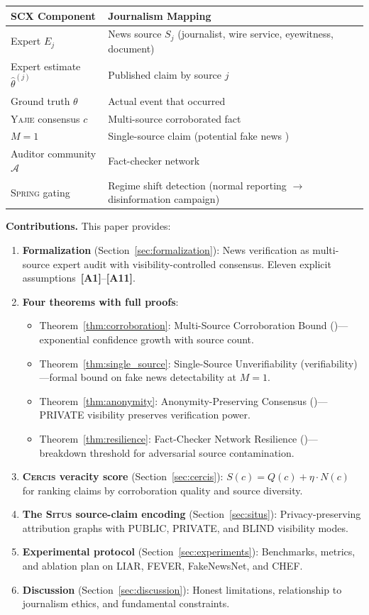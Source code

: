 \documentclass[11pt,a4paper]{article}
\theoremstyle{definition}
\newcommand{\Situs}{\textsc{Situs}}
\newcommand{\Yajie}{\textsc{Yajie}}
\newcommand{\Spring}{\textsc{Spring}}
\newcommand{\Cercis}{\textsc{Cercis}}
\newcommand{\cA}{\mathcal{A}}
\newcommand{\assumptionTag}[1]{\textsf{\textbf{[A#1]}}}
\newcommand{\VISpublic}{\textsc{PUBLIC}}
\newcommand{\VISprivate}{\textsc{PRIVATE}}
\newcommand{\VISblind}{\textsc{BLIND}}
\begin{document}
\begin{center}
\begin{tabular}{ll}
\toprule
\textbf{SCX Component} & \textbf{Journalism Mapping} \\
\midrule
Expert $E_j$ & News source $S_j$ (journalist, wire service, eyewitness, document) \\
Expert estimate $\hat{\theta}^{(j)}$ & Published claim by source $j$ \\
Ground truth $\theta$ & Actual event that occurred \\
\Yajie{} consensus $c$ & Multi-source corroborated fact \\
$M = 1$ & Single-source claim (potential fake news ) \\
Auditor community $\cA$ & Fact-checker network  \\
\Spring{} gating & Regime shift detection (normal reporting $\to$ disinformation campaign) \\
\bottomrule
\end{tabular}
\end{center}

\textbf{Contributions.} This paper provides:

\begin{enumerate}[label=(\roman*)]
    \item \textbf{Formalization} (Section~\ref{sec:formalization}): News verification as multi-source expert audit with visibility-controlled consensus. Eleven explicit assumptions~\assumptionTag{1}--\assumptionTag{11}.
    \item \textbf{Four theorems with full proofs}:
    \begin{itemize}
        \item Theorem~\ref{thm:corroboration}: Multi-Source Corroboration Bound ()---exponential confidence growth with source count.
        \item Theorem~\ref{thm:single_source}: Single-Source Unverifiability (verifiability)---formal bound on fake news detectability at $M = 1$.
        \item Theorem~\ref{thm:anonymity}: Anonymity-Preserving Consensus ()---\VISprivate{} visibility preserves verification power.
        \item Theorem~\ref{thm:resilience}: Fact-Checker Network Resilience ()---breakdown threshold for adversarial source contamination.
    \end{itemize}
    \item \textbf{\Cercis{} veracity score} (Section~\ref{sec:cercis}): $S(c) = Q(c) + \eta \cdot N(c)$ for ranking claims by corroboration quality and source diversity.
    \item \textbf{The \Situs{} source-claim encoding} (Section~\ref{sec:situs}): Privacy-preserving attribution graphs with \VISpublic{}, \VISprivate{}, and \VISblind{} visibility modes.
    \item \textbf{Experimental protocol} (Section~\ref{sec:experiments}): Benchmarks, metrics, and ablation plan on LIAR, FEVER, FakeNewsNet, and CHEF.
    \item \textbf{Discussion} (Section~\ref{sec:discussion}): Honest limitations, relationship to journalism ethics, and fundamental constraints.
\end{enumerate}
\end{document}
